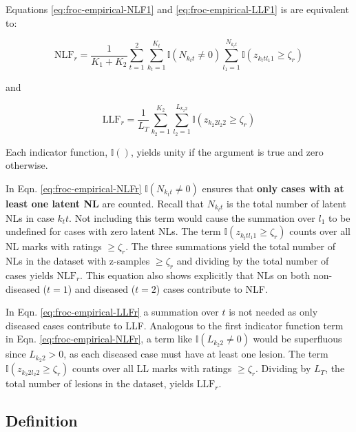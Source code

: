 \documentclass[
]{book}
\begin{document}
Equations \eqref{eq:froc-empirical-NLF1} and \eqref{eq:froc-empirical-LLF1} is are equivalent to:

\begin{equation}
\text{NLF}_r  = \frac{1}{K_1+K_2} \sum_{t=1}^{2} \sum_{k_t=1}^{K_t} \mathbb{I} \left ( N_{k_t t} \neq 0 \right )\sum_{l_1=1}^{N_{k_t t}} \mathbb{I} \left ( z_{k_t t l_1 1} \geq \zeta_r \right ) 
\label{eq:froc-empirical-NLFr}
\end{equation}

and

\begin{equation}
\text{LLF}_r  = \frac{1}{L_T} \sum_{k_2=1}^{K_2} \sum_{l_2=1}^{L_{k_2 2}} \mathbb{I} \left ( z_{k_2 2 l_2 2} \geq \zeta_r  \right ) 
\label{eq:froc-empirical-LLFr}
\end{equation}

Each indicator function, \(\mathbb{I}()\), yields unity if the argument is true and zero otherwise.

In Eqn. \eqref{eq:froc-empirical-NLFr} \(\mathbb{I} \left ( N_{k_t t} \neq 0 \right )\) ensures that \textbf{only cases with at least one latent NL} are counted. Recall that \(N_{k_t t}\) is the total number of latent NLs in case \(k_t t\). Not including this term would cause the summation over \(l_1\) to be undefined for cases with zero latent NLs. The term \(\mathbb{I} \left ( z_{k_t t l_1 1} \geq \zeta_r \right )\) counts over all NL marks with ratings \(\geq \zeta_r\). The three summations yield the total number of NLs in the dataset with z-samples \(\geq \zeta_r\) and dividing by the total number of cases yields \(\text{NLF}_r\). This equation also shows explicitly that NLs on both non-diseased (\(t=1\)) and diseased (\(t=2\)) cases contribute to NLF.

In Eqn. \eqref{eq:froc-empirical-LLFr} a summation over \(t\) is not needed as only diseased cases contribute to LLF. Analogous to the first indicator function term in Eqn. \eqref{eq:froc-empirical-NLFr}, a term like \(\mathbb{I} \left ( L_{k_2 2} \neq 0 \right )\) would be superfluous since \(L_{k_2 2} > 0\), as each diseased case must have at least one lesion. The term \(\mathbb{I} \left ( z_{k_2 2 l_2 2} \geq \zeta_r \right )\) counts over all LL marks with ratings \(\geq \zeta_r\). Dividing by \(L_T\), the total number of lesions in the dataset, yields \(\text{LLF}_r\).

\hypertarget{froc-empirical-definition-auc-FROC}{%
\subsection{Definition}\label{froc-empirical-definition-auc-FROC}}
\end{document}
